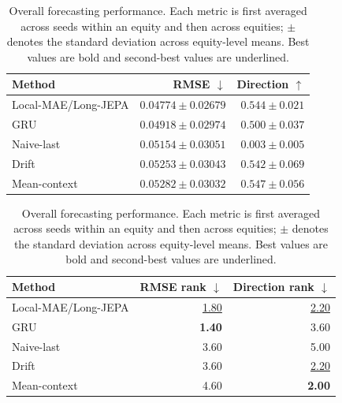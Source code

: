 \begin{table}[t]
\centering
\small
\caption{Overall forecasting performance. Each metric is first averaged across seeds within an equity and then across equities; $\pm$ denotes the standard deviation across equity-level means. Best values are bold and second-best values are underlined.}
\label{tab:main_metrics}
\begin{tabular}{lrr}
\toprule
Method & RMSE $\downarrow$ & Direction $\uparrow$ \\
\midrule
Local-MAE/Long-JEPA & \textbf{$0.04774 \pm 0.02679$} & \underline{$0.544 \pm 0.021$} \\
GRU & \underline{$0.04918 \pm 0.02974$} & $0.500 \pm 0.037$ \\
Naive-last & $0.05154 \pm 0.03051$ & $0.003 \pm 0.005$ \\
Drift & $0.05253 \pm 0.03043$ & $0.542 \pm 0.069$ \\
Mean-context & $0.05282 \pm 0.03032$ & \textbf{$0.547 \pm 0.056$} \\
\bottomrule
\end{tabular}
\par\medskip
\begin{tabular}{lrr}
\toprule
Method & RMSE rank $\downarrow$ & Direction rank $\downarrow$ \\
\midrule
Local-MAE/Long-JEPA & \underline{1.80} & \underline{2.20} \\
GRU & \textbf{1.40} & 3.60 \\
Naive-last & 3.60 & 5.00 \\
Drift & 3.60 & \underline{2.20} \\
Mean-context & 4.60 & \textbf{2.00} \\
\bottomrule
\end{tabular}
\end{table}
